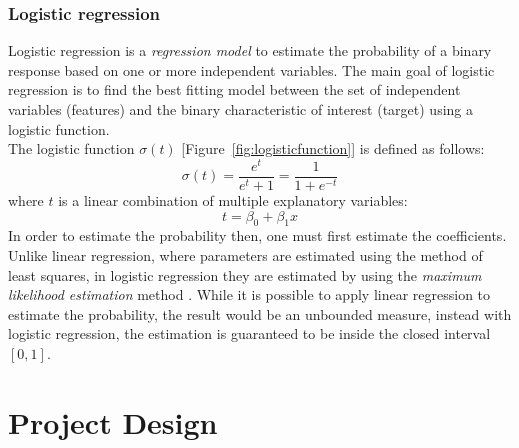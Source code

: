 \documentclass[]{usiinfbachelorproject}
\begin{document}
\subsubsection{Logistic regression}
Logistic regression is a \textit{regression model} to estimate the probability of a binary response based on one or more independent variables.
The main goal of logistic regression is to find the best fitting model between the set of independent variables (features) and the binary characteristic of interest (target) using a logistic
function. \\
The logistic function ${\displaystyle \sigma (t)}$ [Figure~\ref{fig:logisticfunction}] is defined as follows:
\begin{equation}
    \sigma (t) = \dfrac{e^t}{e^t + 1} = \dfrac{1}{1 + e^{-t}}
\end{equation}
where $t$ is a linear combination of multiple explanatory variables:
\begin{equation}
    t = \beta_0 + \beta_1x
\end{equation}
\noindent
In order to estimate the probability then, one must first estimate the coefficients. Unlike linear regression, where parameters are estimated using the method of least squares, in logistic
regression they are estimated by using the \textit{maximum likelihood estimation} method \cite{mle}. While it is possible to apply linear regression to estimate the probability, the result
would be an unbounded measure, instead with logistic regression, the estimation is guaranteed to be inside the closed interval $[0,1]$.
\clearpage
\section{Project Design}
\end{document}
